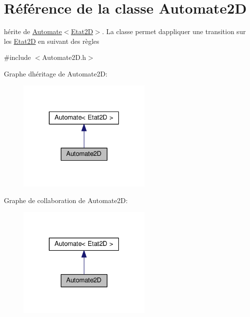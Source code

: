 \hypertarget{class_automate2_d}{}\section{Référence de la classe Automate2D}
\label{class_automate2_d}


hérite de \hyperlink{class_automate}{Automate$<$\+Etat2\+D$>$}. La classe permet d\textquotesingle{}appliquer une transition sur les \hyperlink{class_etat2_d}{Etat2D} en suivant des règles  




{\ttfamily \#include $<$Automate2\+D.\+h$>$}



Graphe d\textquotesingle{}héritage de Automate2D\+:\nopagebreak
\begin{figure}[H]
\begin{center}
\leavevmode
\includegraphics[width=187pt]{class_automate2_d__inherit__graph}
\end{center}
\end{figure}


Graphe de collaboration de Automate2D\+:\nopagebreak
\begin{figure}[H]
\begin{center}
\leavevmode
\includegraphics[width=187pt]{class_automate2_d__coll__graph}
\end{center}
\end{figure}
